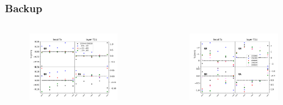 \documentclass[aspectratio=1610, 12pt]{beamer}
\begin{document}
\begin{frame}\frametitle{Backup}
  \begin{columns}
    \begin{column}[c]{0.48\textwidth}
      \begin{figure}
        \includegraphics[width=0.9\textwidth]{plots/stability_plots/diff_MD_T1U_Tx.pdf}
      \end{figure}  
    \end{column}
      \begin{column}[c]{0.48\textwidth}
        \begin{figure}
          \includegraphics[width=0.9\textwidth]{plots/stability_plots/diff_MD_T1U_Tz.pdf}
        \end{figure}  
      \end{column}
  \end{columns}
\end{frame}
\end{document}
